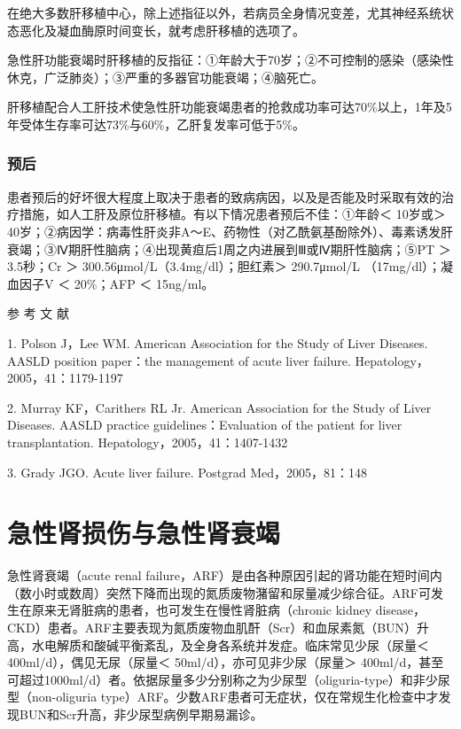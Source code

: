 在绝大多数肝移植中心，除上述指征以外，若病员全身情况变差，尤其神经系统状态恶化及凝血酶原时间变长，就考虑肝移植的选项了。

急性肝功能衰竭时肝移植的反指征：①年龄大于70岁；②不可控制的感染（感染性休克，广泛肺炎）；③严重的多器官功能衰竭；④脑死亡。

肝移植配合人工肝技术使急性肝功能衰竭患者的抢救成功率可达70\%以上，1年及5年受体生存率可达73\%与60\%，乙肝复发率可低于5\%。

\subsection{预后}

患者预后的好坏很大程度上取决于患者的致病病因，以及是否能及时采取有效的治疗措施，如人工肝及原位肝移植。有以下情况患者预后不佳：①年龄＜
10岁或＞
40岁；②病因学：病毒性肝炎非A～E、药物性（对乙酰氨基酚除外）、毒素诱发肝衰竭；③Ⅳ期肝性脑病；④出现黄疸后1周之内进展到Ⅲ或Ⅳ期肝性脑病；⑤PT
＞ 3.5秒；Cr ＞ 300.56μmol/L（3.4mg/dl）；胆红素＞ 290.7μmol/L
（17mg/dl）；凝血因子V ＜ 20\%；AFP ＜ 15ng/ml。

\hypertarget{text00082.htmlux5cux23CHP3-6-2-5}{}
参 考 文 献

1. Polson J，Lee WM. American Association for the Study of Liver
Diseases. AASLD position paper：the management of acute liver failure.
Hepatology，2005，41：1179-1197

2. Murray KF，Carithers RL Jr. American Association for the Study of
Liver Diseases. AASLD practice guidelines：Evaluation of the patient for
liver transplantation. Hepatology，2005，41：1407-1432

3. Grady JGO. Acute liver failure. Postgrad Med，2005，81：148

\protect\hypertarget{text00083.html}{}{}

\chapter{急性肾损伤与急性肾衰竭}

急性肾衰竭（acute renal
failure，ARF）是由各种原因引起的肾功能在短时间内（数小时或数周）突然下降而出现的氮质废物潴留和尿量减少综合征。ARF可发生在原来无肾脏病的患者，也可发生在慢性肾脏病（chronic
kidney
disease，CKD）患者。ARF主要表现为氮质废物血肌酐（Scr）和血尿素氮（BUN）升高，水电解质和酸碱平衡紊乱，及全身各系统并发症。临床常见少尿（尿量＜
400ml/d），偶见无尿（尿量＜ 50ml/d），亦可见非少尿（尿量＞
400ml/d，甚至可超过1000ml/d）者。依据尿量多少分别称之为少尿型（oliguria-type）和非少尿型（non-oliguria
type）ARF。少数ARF患者可无症状，仅在常规生化检查中才发现BUN和Scr升高，非少尿型病例早期易漏诊。

